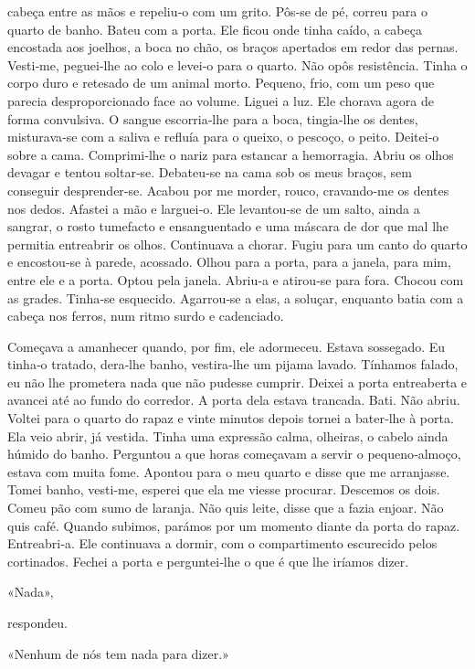 cabeça entre as mãos e repeliu­‑o com um grito. Pôs­‑se de pé, correu
para o quarto de banho. Bateu com a porta. Ele ficou onde tinha caído, a
cabeça encostada aos joelhos, a boca no chão, os braços apertados em
redor das pernas. Vesti­‑me, peguei­‑lhe ao colo e levei­‑o para o
quarto. Não opôs resistência. Tinha o corpo duro e retesado de um animal
morto. Pequeno, frio, com um peso que parecia desproporcionado face ao
volume. Liguei a luz. Ele chorava agora de forma convulsiva. O sangue
escorria­‑lhe para a boca, tingia­‑lhe os dentes, misturava­‑se com a
saliva e refluía para o queixo, o pescoço, o peito. Deitei­‑o sobre a
cama. Comprimi­‑lhe o nariz para estancar a hemorragia. Abriu os olhos
devagar e tentou soltar­‑se. Debateu­‑se na cama sob os meus braços, sem
conseguir desprender­‑se. Acabou por me morder, rouco, cravando­‑me os
dentes nos dedos. Afastei a mão e larguei­‑o. Ele levantou­‑se de um
salto, ainda a sangrar, o rosto tumefacto e ensanguentado e uma máscara
de dor que mal lhe permitia entreabrir os olhos. Continuava a chorar.
Fugiu para um canto do quarto e encostou­‑se à parede, acossado. Olhou
para a porta, para a janela, para mim, entre ele e a porta. Optou pela
janela. Abriu­‑a e atirou­‑se para fora. Chocou com as grades. Tinha­‑se
esquecido. Agarrou­‑se a elas, a soluçar, enquanto batia com a cabeça
nos ferros, num ritmo surdo e cadenciado.

Começava a amanhecer quando, por fim, ele adormeceu. Estava sossegado.
Eu tinha­‑o tratado, dera­‑lhe banho, vestira­‑lhe um pijama lavado.
Tínhamos falado, eu não lhe prometera nada que não pudesse cumprir.
Deixei a porta entreaberta e avancei até ao fundo do corredor. A porta
dela estava trancada. Bati. Não abriu. Voltei para o quarto do rapaz e
vinte minutos depois tornei a bater­‑lhe à porta. Ela veio abrir, já
vestida. Tinha uma expressão calma, olheiras, o cabelo ainda húmido do
banho. Perguntou a que horas começavam a servir o pequeno­‑almoço,
estava com muita fome. Apontou para o meu quarto e disse que me
arranjasse. Tomei banho, vesti­‑me, esperei que ela me viesse procurar.
Descemos os dois. Comeu pão com sumo de laranja. Não quis leite, disse
que a fazia enjoar. Não quis café. Quando subimos, parámos por um
momento diante da porta do rapaz. Entreabri­‑a. Ele continuava a dormir,
com o compartimento escurecido pelos cortinados. Fechei a porta e
perguntei­‑lhe o que é que lhe iríamos dizer.

«Nada»,

respondeu.

«Nenhum de nós tem nada para dizer.»

